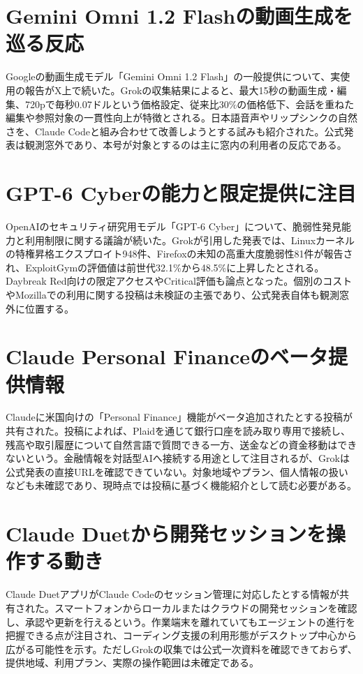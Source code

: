 \section{Gemini Omni 1.2 Flashの動画生成を巡る反応}
Googleの動画生成モデル「Gemini Omni 1.2 Flash」の一般提供について、実使用の報告がX上で続いた。Grokの収集結果によると、最大15秒の動画生成・編集、720pで毎秒0.07ドルという価格設定、従来比30\%の価格低下、会話を重ねた編集や参照対象の一貫性向上が特徴とされる。日本語音声やリップシンクの自然さを、Claude Codeと組み合わせて改善しようとする試みも紹介された。公式発表は観測窓外であり、本号が対象とするのは主に窓内の利用者の反応である。

\section{GPT-6 Cyberの能力と限定提供に注目}
OpenAIのセキュリティ研究用モデル「GPT-6 Cyber」について、脆弱性発見能力と利用制限に関する議論が続いた。Grokが引用した発表では、Linuxカーネルの特権昇格エクスプロイト948件、Firefoxの未知の高重大度脆弱性81件が報告され、ExploitGymの評価値は前世代32.1\%から48.5\%に上昇したとされる。Daybreak Red向けの限定アクセスやCritical評価も論点となった。個別のコストやMozillaでの利用に関する投稿は未検証の主張であり、公式発表自体も観測窓外に位置する。

\section{Claude Personal Financeのベータ提供情報}
Claudeに米国向けの「Personal Finance」機能がベータ追加されたとする投稿が共有された。投稿によれば、Plaidを通じて銀行口座を読み取り専用で接続し、残高や取引履歴について自然言語で質問できる一方、送金などの資金移動はできないという。金融情報を対話型AIへ接続する用途として注目されるが、Grokは公式発表の直接URLを確認できていない。対象地域やプラン、個人情報の扱いなども未確認であり、現時点では投稿に基づく機能紹介として読む必要がある。

\section{Claude Duetから開発セッションを操作する動き}
Claude DuetアプリがClaude Codeのセッション管理に対応したとする情報が共有された。スマートフォンからローカルまたはクラウドの開発セッションを確認し、承認や更新を行えるという。作業端末を離れていてもエージェントの進行を把握できる点が注目され、コーディング支援の利用形態がデスクトップ中心から広がる可能性を示す。ただしGrokの収集では公式一次資料を確認できておらず、提供地域、利用プラン、実際の操作範囲は未確定である。

